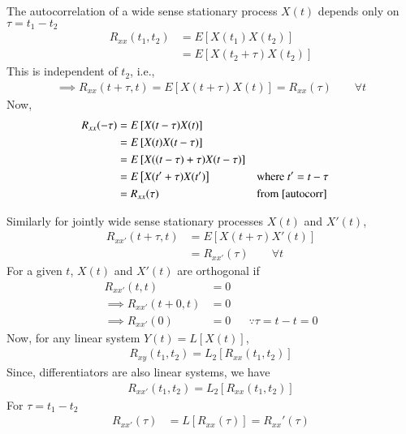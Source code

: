 \documentclass{beamer}
\providecommand{\mean}[1]{E\left[ #1 \right]}
\begin{document}
	\begin{frame}
	The autocorrelation of a wide sense stationary process $X(t)$ depends only on $\tau = t_1 - t_2$
	\begin{align}
		R_{xx}(t_1, t_2) &= \mean{X(t_1) X(t_2)} \\
		&= \mean{X(t_2+\tau) X(t_2)}
	\end{align}
	This is independent of $t_2$, i.e.,
	\begin{align}
		\implies R_{xx}(t+\tau,t) = \mean{X(t+\tau) X(t)} = R_{xx}(\tau) \qquad \forall t \label{autocorr}
	\end{align}	
	Now, 
	\begin{align}
		R_{xx}(-\tau) &= \mean{X(t-\tau) X(t)} \\
		&= \mean{X(t) X(t-\tau)} \\
		&= \mean{X((t-\tau)+\tau) X(t-\tau)} \\
		&= \mean{X(t'+\tau) X(t')} && \text{where } t' = t - \tau \\
		&= R_{xx}(\tau) && \text{from } \ref{autocorr}
	\end{align}
	\end{frame}
	
	\begin{frame}
	Similarly for jointly wide sense stationary processes $X(t)$ and $X'(t)$, 
	\begin{align}
		R_{xx'}(t+\tau,t) &= \mean{X(t+\tau)X'(t)} \\
		&= R_{xx'}(\tau) \qquad \forall t
	\end{align}
	For a given $t$, $X(t)$ and $X'(t)$ are orthogonal if 
	\begin{align}
		R_{xx'}(t,t) &= 0 \\
		\implies R_{xx'}(t+0,t) &= 0 \\
		\implies R_{xx'}(0) &= 0 && \because \tau = t - t = 0 
	\end{align}
	Now, for any linear system $Y(t) = L[X(t)]$,
	\begin{align}
		R_{xy}(t_1, t_2) = L_2[R_{xx}(t_1, t_2)]
	\end{align}
	Since, differentiators are also linear systems, we have
	\begin{align}
		R_{xx'}(t_1, t_2) = L_2[R_{xx}(t_1, t_2)] 
	\end{align}
	For $\tau = t_1 - t_2$
	\begin{align}
		R_{xx'}(\tau) &= L[R_{xx}(\tau)] = R_{xx}'(\tau)
	\end{align}
	\end{frame}
	
\end{document}
